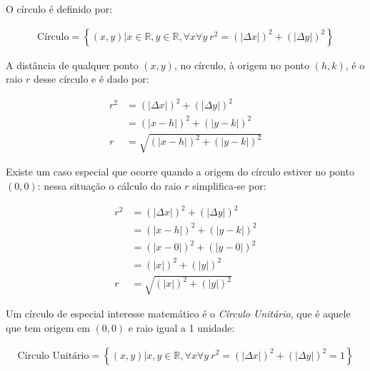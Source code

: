 \documentclass[pdftex, brazil, 12pt, twoside]{article}
\begin{document}
O círculo é definido por:

\begin{equation}
  \begin{split}
    \text{Círculo} = \left\{(x, y) | x \in \mathbb{R}, y \in \mathbb{R}, \forall x \forall y\ r^2 = (|\Delta x|)^2 + (|\Delta y|)^2\right\}
  \end{split}
\end{equation}

A distância de qualquer ponto $(x, y)$, no círculo, à origem no ponto $(h, k)$, é o raio $r$ desse círculo
e é dado por:

\begin{equation}
  \begin{split}
    r^2 & = (|\Delta x|)^2 + (|\Delta y|)^2\\
        & = (|x - h|)^2 + (|y - k|)^2\\
      r & = \sqrt{(|x - h|)^2 + (|y - k|)^2}
  \end{split}
\end{equation}

Existe um caso especial que ocorre quando a origem do círculo estiver no ponto $(0, 0)$: nessa
situação o cálculo do raio $r$ simplifica-se por:

\begin{equation}
  \begin{split}
    r^2 & = (|\Delta x|)^2 + (|\Delta y|)^2\\
        & = (|x - h|)^2 + (|y - k|)^2\\
        & = (|x - 0|)^2 + (|y - 0|)^2\\
        & = (|x|)^2 + (|y|)^2\\
      r & = \sqrt{(|x|)^2 + (|y|)^2}
  \end{split}
\end{equation}

Um círculo de especial interesse matemático é o \emph{Círculo Unitário}, que é aquele
que tem origem em $(0, 0)$ e raio igual a 1 unidade:

\begin{equation}
  \begin{split}
    \text{Círculo Unitário} = \left\{(x, y) | x,y \in \mathbb{R}, \forall x \forall y\ r^2 = (|\Delta x|)^2 + (|\Delta y|)^2 = 1\right\}
  \end{split}
\end{equation}


\end{document}
